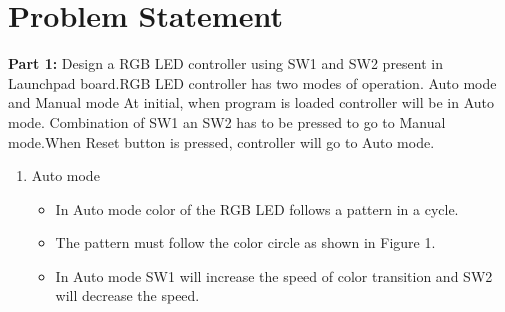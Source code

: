 \documentclass[a4paper,12pt,oneside]{book}
\begin{document}
\section{Problem Statement}
\textbf{Part 1:} 
Design a RGB LED controller using SW1 and SW2 present in Launchpad board.RGB LED controller has two modes of operation. Auto mode and Manual mode
At initial, when program is loaded controller will be in Auto mode. Combination of SW1 an SW2 has to be pressed to go to Manual mode.When Reset button is pressed, controller will go to Auto mode.
\begin{enumerate}
\item Auto mode
\begin{itemize}
  \item In Auto mode color of the RGB LED follows a pattern in a cycle.
  \item The pattern must follow the color circle as shown in Figure 1.
  \item In Auto mode SW1 will increase the speed of color transition and SW2 will decrease the speed.
\end{itemize}


\end{enumerate}
\end{document}
